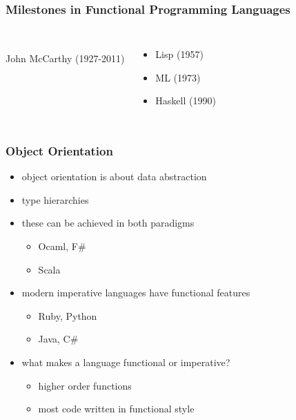 \documentclass[dvipsnames]{beamer}
\theoremstyle{plain}
\begin{document}
\begin{frame}
  \frametitle{Milestones in Functional Programming Languages}

  \begin{columns}
    \begin{center}
      \\
      John McCarthy (1927-2011)
    \end{center}

    \begin{itemize}
      \item Lisp (1957)
      \item ML (1973)
      \item Haskell (1990)
    \end{itemize}
  \end{columns}
\end{frame}

\begin{frame}
  \frametitle{Object Orientation}

  \begin{itemize}
    \item object orientation is about data abstraction
    \item type hierarchies

    \medskip
    \item these can be achieved in both paradigms
    \begin{itemize}
      \item Ocaml, F\#
      \item Scala
    \end{itemize}
    \item modern imperative languages have functional features
    \begin{itemize}
      \item Ruby, Python
      \item Java, C\#
    \end{itemize}

    \pause
    \medskip
    \item what makes a language functional or imperative?
    \begin{itemize}
      \item higher order functions
      \item most code written in functional style
    \end{itemize}
  \end{itemize}
\end{frame}
\end{document}
